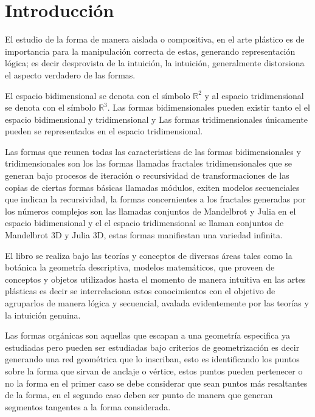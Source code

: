 \documentclass[16pt,]{krantz}
\theoremstyle{definition}
\theoremstyle{definition}
\theoremstyle{definition}
\theoremstyle{definition}
\theoremstyle{remark}
\begin{document}
\hypertarget{introducciuxf3n}{%
\chapter*{Introducción}\label{introducciuxf3n}}


El estudio de la forma de manera aislada o compositiva, en el arte plástico es de importancia para la manipulación correcta de estas, generando representación lógica; es decir desprovista de la intuición, la intuición, generalmente distorsiona el aspecto verdadero de las formas.

El espacio bidimensional se denota con el símbolo \(\mathbb{R}^2\) y al espacio tridimensional se denota con el símbolo \(\mathbb{R}^3\). Las formas bidimensionales pueden existir tanto el el espacio bidimensional y tridimensional y Las formas tridimensionales únicamente pueden se representados en el espacio tridimensional.

Las formas que reunen todas las caracteristicas de las formas bidimensionales y tridimensionales son los las formas llamadas fractales tridimensionales que se generan bajo procesos de iteración o recursividad de transformaciones de las copias de ciertas formas básicas llamadas módulos, exiten modelos secuenciales que indican la recursividad, la formas concernientes a los fractales generadas por los números complejos son las llamadas conjuntos de Mandelbrot y Julia en el espacio bidimensional y el el espacio tridimensional se llaman conjuntos de Mandelbrot 3D y Julia 3D, estas formas manifiestan una variedad infinita.

El libro se realiza bajo las teorías y conceptos de diversas áreas tales como la botánica la geometría descriptiva, modelos matemáticos, que proveen de conceptos y objetos utilizados hasta el momento de manera intuitiva en las artes plásticas es decir se interrelaciona estos conocimientos con el objetivo de agruparlos de manera lógica y secuencial, avalada evidentemente por las teorías y la intuición genuina.

Las formas orgánicas son aquellas que escapan a una geometría especifica ya estudiadas pero pueden ser estudiadas bajo criterios de geometrización es decir generando una red geométrica que lo inscriban, esto es identificando los puntos sobre la forma que sirvan de anclaje o vértice, estos puntos pueden pertenecer o no la forma en el primer caso se debe considerar que sean puntos más resaltantes de la forma, en el segundo caso deben ser punto de manera que generan segmentos tangentes a la forma considerada.
\end{document}
